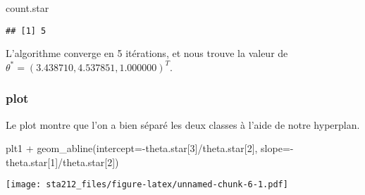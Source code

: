 \documentclass[
]{article}
\newenvironment{Shaded}{\begin{snugshade}}{\end{snugshade}}
\newcommand{\AttributeTok}[1]{\textcolor[rgb]{0.77,0.63,0.00}{#1}}
\newcommand{\DecValTok}[1]{\textcolor[rgb]{0.00,0.00,0.81}{#1}}
\newcommand{\FunctionTok}[1]{\textcolor[rgb]{0.00,0.00,0.00}{#1}}
\newcommand{\NormalTok}[1]{#1}
\newcommand{\SpecialCharTok}[1]{\textcolor[rgb]{0.00,0.00,0.00}{#1}}
\begin{document}
\begin{Shaded}
\begin{Highlighting}[]
\NormalTok{count.star}
\end{Highlighting}
\end{Shaded}

\begin{verbatim}
## [1] 5
\end{verbatim}

L'algorithme converge en 5 itérations, et nous trouve la valeur de
\(\theta^* = (3.438710, 4.537851, 1.000000)^T\).

\hypertarget{plot}{%
\subsubsection{plot}\label{plot}}

Le plot montre que l'on a bien séparé les deux classes à l'aide de notre
hyperplan.

\begin{Shaded}
\begin{Highlighting}[]
\NormalTok{plt1 }\SpecialCharTok{+} \FunctionTok{geom\_abline}\NormalTok{(}\AttributeTok{intercept=}\SpecialCharTok{{-}}\NormalTok{theta.star[}\DecValTok{3}\NormalTok{]}\SpecialCharTok{/}\NormalTok{theta.star[}\DecValTok{2}\NormalTok{], }\AttributeTok{slope=}\SpecialCharTok{{-}}\NormalTok{theta.star[}\DecValTok{1}\NormalTok{]}\SpecialCharTok{/}\NormalTok{theta.star[}\DecValTok{2}\NormalTok{])}
\end{Highlighting}
\end{Shaded}

\texttt{[image: sta212\_files/figure-latex/unnamed-chunk-6-1.pdf]}
\end{document}
